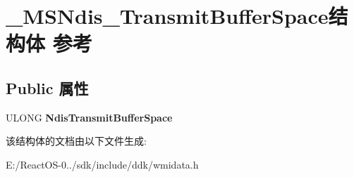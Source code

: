 \hypertarget{struct___m_s_ndis___transmit_buffer_space}{}\section{\+\_\+\+M\+S\+Ndis\+\_\+\+Transmit\+Buffer\+Space结构体 参考}
\label{struct___m_s_ndis___transmit_buffer_space}
\subsection*{Public 属性}
\begin{DoxyCompactItemize}
\item 
\mbox{\label{struct___m_s_ndis___transmit_buffer_space_a9ed7a777a8975fbb42806841fffe67f9}} 
U\+L\+O\+NG {\bfseries Ndis\+Transmit\+Buffer\+Space}
\end{DoxyCompactItemize}


该结构体的文档由以下文件生成\+:\begin{DoxyCompactItemize}
\item 
E\+:/\+React\+O\+S-\/0../sdk/include/ddk/wmidata.\+h\end{DoxyCompactItemize}
